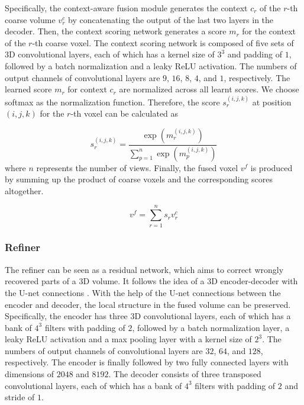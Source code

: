 \documentclass[10pt,twocolumn,letterpaper]{article}
\begin{document}
Specifically, the context-aware fusion module generates the context $c_r$ of the $r$-th coarse volume $v_r^c$ by concatenating the output of the last two layers in the decoder.
Then, the context scoring network generates a score $m_r$ for the context of the $r$-th coarse voxel.
The context scoring network is composed of five sets of 3D convolutional layers, each of which has a kernel size of $3^3$ and padding of $1$, followed by a batch normalization and a leaky ReLU activation.
The numbers of output channels of convolutional layers are $9$, $16$, $8$, $4$, and $1$, respectively.
The learned score $m_r$ for context $c_r$ are normalized across all learnt scores.
We choose softmax as the normalization function. 
Therefore, the score $s_r^{(i, j, k)}$ at position $(i, j, k)$ for the $r$-th voxel can be calculated as 

\begin{equation}
  s_r^{(i, j, k)} = \frac{\exp\left(m_r^{(i, j, k)}\right)}{\sum_{p=1}^n \exp\left(m_p^{(i, j, k)}\right)}  
\end{equation}
where $n$ represents the number of views.
Finally, the fused voxel $v^f$ is produced by summing up the product of coarse voxels and the corresponding scores altogether.

\begin{equation}
  v^f = \sum_{r=1}^n s_r v_r^c
\end{equation}

\vspace{-3 mm}
\subsubsection{Refiner}
\vspace{-1 mm}

The refiner can be seen as a residual network, which aims to correct wrongly recovered parts of a 3D volume.
It follows the idea of a 3D encoder-decoder with the U-net connections \cite{DBLP:conf/miccai/RonnebergerFB15}. 
With the help of the U-net connections between the encoder and decoder, the local structure in the fused volume can be preserved.
Specifically, the encoder has three 3D convolutional layers, each of which has a bank of $4^3$ filters with padding of $2$, followed by a batch normalization layer, a leaky ReLU activation and a max pooling layer with a kernel size of $2^3$.
The numbers of output channels of convolutional layers are $32$, $64$, and $128$, respectively.
The encoder is finally followed by two fully connected layers with dimensions of $2048$ and $8192$.
The decoder consists of three transposed convolutional layers, each of which has a bank of $4^3$ filters with padding of $2$ and stride of $1$.
\end{document}
